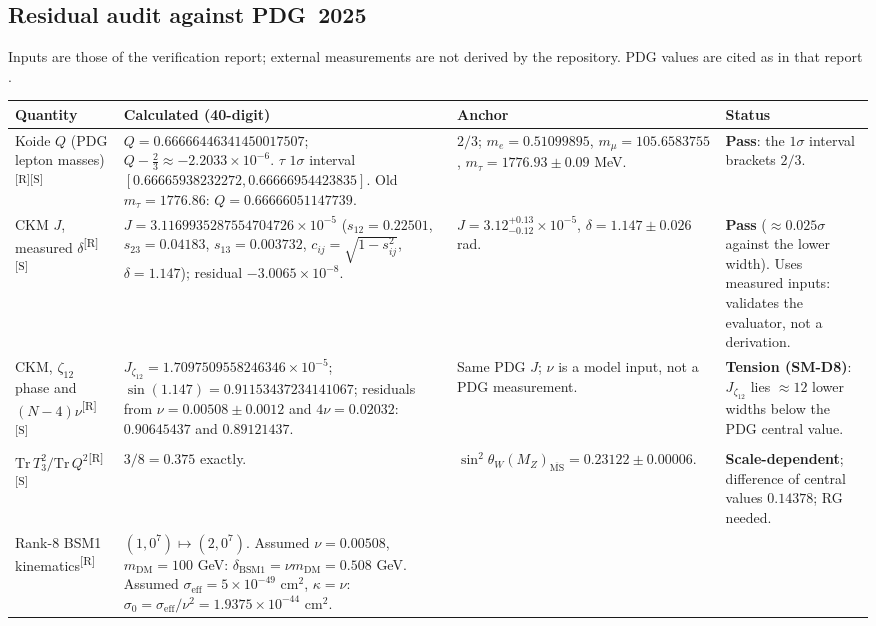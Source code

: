 \documentclass[11pt,a4paper]{article}
\theoremstyle{definition}
\theoremstyle{remark}
\newcommand{\tR}{\textsuperscript{[R]}}
\newcommand{\tS}{\textsuperscript{[S]}}
\begin{document}
\subsection{Residual audit against PDG~2025}\label{sec:audit}
Inputs are those of the verification report; external measurements are not derived by the repository. PDG values are cited as in that report \cite{PDG2025}.
\begin{table}[!htbp]
\centering\footnotesize
\renewcommand{\arraystretch}{1.15}
\begin{tabularx}{\textwidth}{@{}>{\raggedright\arraybackslash}p{2.6cm}>{\raggedright\arraybackslash}X>{\raggedright\arraybackslash}p{3.4cm}>{\raggedright\arraybackslash}p{2.6cm}@{}}
\toprule
Quantity & Calculated (40-digit) & Anchor & Status\\
\midrule
Koide $Q$ (PDG lepton masses)\tR\tS &
$Q=0.66666446341450017507$; $Q-\tfrac23\approx-2.2033\times10^{-6}$. $\tau$ $1\sigma$ interval $[0.66665938232272, 0.66666954423835]$. Old $m_\tau=1776.86$: $Q=0.66666051147739$. &
$2/3$; $m_e=0.51099895$, $m_\mu=105.6583755$, $m_\tau=1776.93\pm0.09$ MeV. &
\textbf{Pass}: the $1\sigma$ interval brackets $2/3$.\\
CKM $J$, measured $\delta$\tR\tS &
$J=3.1169935287554704726\times10^{-5}$ ($s_{12}=0.22501$, $s_{23}=0.04183$, $s_{13}=0.003732$, $c_{ij}=\sqrt{1-s_{ij}^2}$, $\delta=1.147$); residual $-3.0065\times10^{-8}$. &
$J=3.12^{+0.13}_{-0.12}\times10^{-5}$, $\delta=1.147\pm0.026$ rad. &
\textbf{Pass} ($\approx0.025\sigma$ against the lower width). Uses measured inputs: validates the evaluator, not a derivation.\\
CKM, $\zeta_{12}$ phase and $(N-4)\nu$\tR\tS &
$J_{\zeta_{12}}=1.7097509558246346\times10^{-5}$; $\sin(1.147)=0.91153437234141067$; residuals from $\nu=0.00508\pm0.0012$ and $4\nu=0.02032$: $0.90645437$ and $0.89121437$. &
Same PDG $J$; $\nu$ is a model input, not a PDG measurement. &
\textbf{Tension (SM-D8)}: $J_{\zeta_{12}}$ lies $\approx12$ lower widths below the PDG central value.\\
$\mathrm{Tr}\,T_3^2/\mathrm{Tr}\,Q^2$\tR\tS &
$3/8=0.375$ exactly. &
$\sin^2\theta_W(M_Z)_{\overline{\mathrm{MS}}}=0.23122\pm0.00006$. &
\textbf{Scale-dependent}; difference of central values $0.14378$; RG needed.\\
Rank-$8$ BSM1 kinematics\tR &
$(1,0^7)\mapsto(2,0^7)$. Assumed $\nu=0.00508$, $m_{\mathrm{DM}}=100$ GeV: $\delta_{\mathrm{BSM1}}=\nu m_{\mathrm{DM}}=0.508$ GeV. Assumed $\sigma_{\mathrm{eff}}=5\times10^{-49}$ cm$^2$, $\kappa=\nu$: $\sigma_0=\sigma_{\mathrm{eff}}/\nu^2=1.9375\times10^{-44}$ cm$^2$. &

\end{tabularx}
\end{table}
\end{document}
